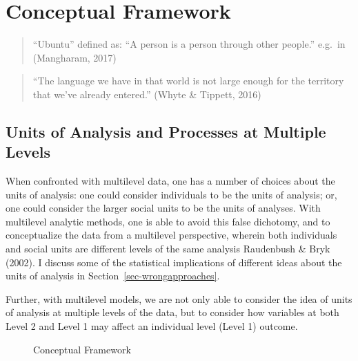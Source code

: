 \documentclass[
  letterpaper,
  DIV=11,
  numbers=noendperiod]{scrreprt}
\begin{document}

\chapter{Conceptual Framework}\label{sec-conceptualframework}

\begin{quote}
``Ubuntu'' defined as: ``A person is a person through other people.''
e.g.~in (Mangharam, 2017)
\end{quote}

\begin{quote}
``The language we have in that world is not large enough for the
territory that we've already entered.'' (Whyte \& Tippett, 2016)
\end{quote}

\section{Units of Analysis and Processes at Multiple
Levels}\label{units-of-analysis-and-processes-at-multiple-levels}

When confronted with multilevel data, one has a number of choices about
the units of analysis: one could consider individuals to be the units of
analysis; or, one could consider the larger social units to be the units
of analyses. With multilevel analytic methods, one is able to avoid this
false dichotomy, and to conceptualize the data from a multilevel
perspective, wherein both individuals and social units are different
levels of the same analysis Raudenbush \& Bryk (2002). I discuss some of
the statistical implications of different ideas about the units of
analysis in Section~\ref{sec-wrongapproaches}. 

Further, with multilevel models, we are not only able to consider the
idea of units of analysis at multiple levels of the data, but to
consider how variables at both Level 2 and Level 1 may affect an
individual level (Level 1) outcome.

\begin{figure}


\caption{\label{fig-conceptual}Conceptual Framework}

\end{figure}%
\end{document}
